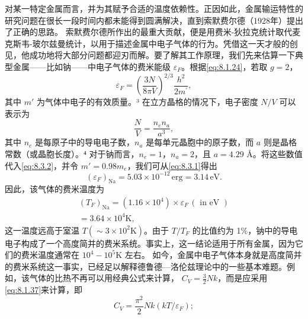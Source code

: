 对某一特定金属而言，并为其赋予合适的温度依赖性。正因如此，金属输运特性的研究问题在很长一段时间内都未能得到圆满解决，直到索默费尔德（1928年）提出了正确的思路。
索默费尔德所作出的最重大贡献，便是用费米-狄拉克统计取代麦克斯韦-玻尔兹曼统计，以用于描述金属中电子气体的行为。凭借这一天才般的创见，他成功地将大部分问题都迎刃而解。要了解其工作原理，我们先来估算一下典型金属——比如钠——中电子气体的费米能级 \(\varepsilon_F\)。根据\autoref{eq:8.1.24}，若取 \(g=2\)，
\begin{equation}\tag{8.3.1}\label{eq:8.3.1}
\varepsilon _ { F } = \left( \frac { 3 N } { 8 \pi V } \right) ^{2 / 3} \frac { h ^{2} } { 2 m ^{\prime} } ,
\end{equation}
其中 \(m'\) 为气体中电子的有效质量。³ 在立方晶格的情况下，电子密度 \(N/V\) 可以表示为
\begin{equation}\tag{8.3.2}\label{eq:8.3.2}
\frac { N } { V } = \frac { n _ { e } n _ { a } } { a ^{3} } ,
\end{equation}
其中 \(n_{e}\) 是每原子中的导电电子数，\(n_{a}\) 是每单元晶胞中的原子数，而 \(a\) 则是晶格常数（或晶胞长度）。⁴ 对于钠而言，\(n_{e}=1\)，\(n_{a}=2\)，且 \(a=4.29\) Å。将这些数值代入\autoref{eq:8.3.2}，并令 \(m'=0.98m_{e}\)，我们可从\autoref{eq:8.3.1}得出
\begin{equation}\tag{8.3.3}\label{eq:8.3.3}
( \varepsilon _ { F } ) _ { \mathrm { N a } } = 5 . 03 \times 10 ^{- 12} \, \mathrm { e r g } = 3 . 14 \, \mathrm { e V } .
\end{equation}
因此，该气体的费米温度为
\begin{equation}\tag{8.3.4}\label{eq:8.3.4}
\begin{array}{r} { ( T _ { F } ) _ { \mathrm { N a } } = ( 1 . 16 \times 10 ^{4} ) \times \varepsilon _ { F } \, ( \text { in eV } ) } \\{ = 3 . 64 \times 10 ^{4} \mathrm { K } , } \end{array}
\end{equation}
这一温度远高于室温 \(T(\sim 3 \times 10^{2} \mathrm{K})\)。由于 \(T / T_{F}\) 的比值约为 1\%，钠中的导电电子构成了一个高度简并的费米系统。事实上，这一结论适用于所有金属，因为它们的费米温度通常在 \(10^{4}-10^{5} \mathrm{K}\) 左右。
如今，金属中电子气体本身就是高度简并的费米系统这一事实，已经足以解释德鲁德---洛伦兹理论中的一些基本难题。例如，该气体的比热不再可以用经典公式来计算，
\(C_{V}=\frac{3}{2}Nk\)，而是应采用\autoref{eq:8.1.37}来计算，即
\begin{equation}\tag{8.3.5}\label{eq:8.3.5}
C _ { V } = \frac { \pi ^{2} } { 2 } N k ( k T / \varepsilon _ { F } ) ;
\end{equation}
